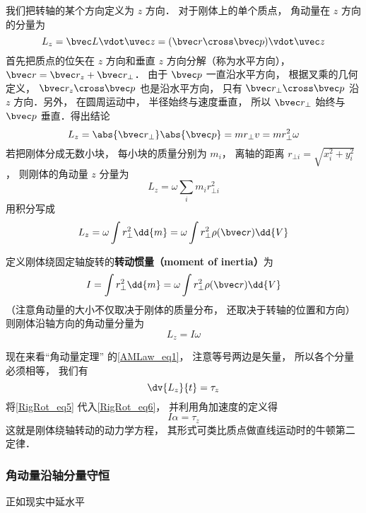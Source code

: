我们把转轴的某个方向定义为 $z$ 方向． 对于刚体上的单个质点， 角动量在 $z$ 方向的分量为
\begin{equation}
L_z = \bvec L \vdot \uvec z = ( \bvec r \cross \bvec p ) \vdot \uvec z
\end{equation}
首先把质点的位矢在 $z$ 方向和垂直 $z$ 方向分解（称为水平方向）， $\bvec r = \bvec r_z + \bvec r_ \bot$． 由于 $\bvec p$ 一直沿水平方向， 根据叉乘的几何定义， $\bvec r_z \cross \bvec p$ 也是沿水平方向， 只有 $\bvec r_ \bot \cross \bvec p$ 沿 $z$ 方向．另外， 在圆周运动中， 半径始终与速度垂直， 所以 $\bvec r_ \bot$ 始终与 $\bvec p$ 垂直．得出结论
\begin{equation}
L_z = \abs{\bvec r_\bot} \abs{\bvec p} = m r_ \bot v = mr_ \bot ^2\omega 
\end{equation}
若把刚体分成无数小块， 每小块的质量分别为 $m_i$， 离轴的距离 $r_{\bot i} = \sqrt{x_i^2 + y_i^2} $， 则刚体的角动量 $z$ 分量为
\begin{equation}
L_z = \omega \sum_i m_i r_{ \bot i}^2
\end{equation}
用积分写成
\begin{equation}
L_z = \omega \int r_ \bot ^2 \dd{m} = \omega \int r_ \bot ^2\rho(\bvec r)  \dd{V} 
\end{equation}

定义刚体绕固定轴旋转的\textbf{转动惯量（moment of inertia）}为
\begin{equation}
I = \int r_ \bot ^2 \dd{m} = \omega \int r_ \bot ^2\rho(\bvec r) \dd{V} 
\end{equation}
（注意角动量的大小不仅取决于刚体的质量分布， 还取决于转轴的位置和方向）则刚体沿轴方向的角动量分量为
\begin{equation}\label{RigRot_eq5}
L_z = I \omega 
\end{equation}

现在来看“角动量定理” 的\autoref{AMLaw_eq1}， 注意等号两边是矢量， 所以各个分量必须相等， 我们有
\begin{equation}\label{RigRot_eq6}
\dv{L_z}{t} = \tau_z
\end{equation}
将\autoref{RigRot_eq5} 代入\autoref{RigRot_eq6}， 并利用角加速度的定义得
\begin{equation}\label{RigRot_eq7}
I\alpha = \tau_z
\end{equation}
这就是刚体绕轴转动的动力学方程， 其形式可类比质点做直线运动时的牛顿第二定律．

\subsubsection{角动量沿轴分量守恒}
正如现实中延水平

